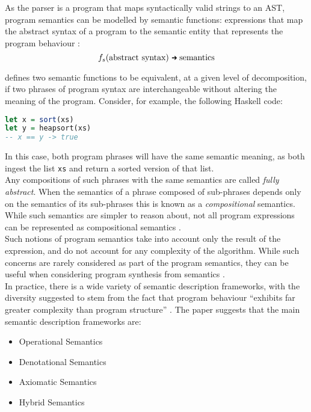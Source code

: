 As the parser is a program that maps syntactically valid strings to an AST, program semantics can be modelled by semantic functions: expressions that map the abstract syntax of a program to the semantic entity that represents the program behaviour \citep{mosses1992action}:
\begin{equation}
    f_s(\text{abstract syntax}) \mathgoesto \text{semantics}
\end{equation}

\citet{mosses1992action} defines two semantic functions to be equivalent, at a given level of decomposition, if two phrases of program syntax are interchangeable without altering the meaning of the program. 
Consider, for example, the following Haskell code:
\begin{lstlisting}[language=haskell]
let x = sort(xs)
let y = heapsort(xs)
-- x == y -> true
\end{lstlisting}
In this case, both program phrases will have the same semantic meaning, as both ingest the list \lstinline[language=haskell]{xs} and return a sorted version of that list.\\

Any compositions of such phrases with the same semantics are called \textit{fully abstract}. 
When the semantics of a phrase composed of sub-phrases depends only on the semantics of its sub-phrases this is known as a \textit{compositional} semantics. 
While such semantics are simpler to reason about, not all program expressions can be represented as compositional semantics \citep{mosses1992action}.\\

Such notions of program semantics take into account only the result of the expression, and do not account for any complexity of the algorithm.
While such concerns are rarely considered as part of the program semantics, they can be useful when considering program synthesis from semantics \citep{kanovich1991efficient}.\\

In practice, there is a wide variety of semantic description frameworks, with the diversity suggested to stem from the fact that program behaviour ``exhibits far greater complexity than program structure'' \citep[pg. 14]{Zhang:2004:SSD:981009.981013}.
The paper suggests that the main semantic description frameworks are:
\begin{itemize}
    \item Operational Semantics
    \item Denotational Semantics
    \item Axiomatic Semantics
    \item Hybrid Semantics
\end{itemize}

